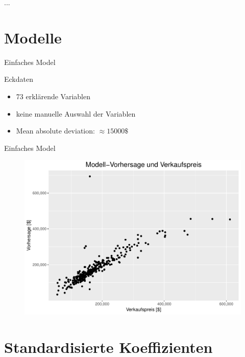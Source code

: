 \documentclass[10pt]{beamer}
\begin{document}
\begin{frame}{...}
	

\end{frame}


\section{Modelle}

\begin{frame}{Einfaches Model}
	
	\begin{Large}{Eckdaten}\end{Large}
	\begin{itemize}
		\item 73 erklärende Variablen
		\item keine manuelle Auswahl der Variablen
		\item Mean absolute deviation: $\approx 15 000 \$$
	\end{itemize}
	
\end{frame}

\begin{frame}{Einfaches Model}
	
	\begin{figure}
		\includegraphics[width=\textwidth, keepaspectratio]{figures/simple_model}
	\end{figure}
	
\end{frame}

\section{Standardisierte Koeffizienten}
\end{document}
